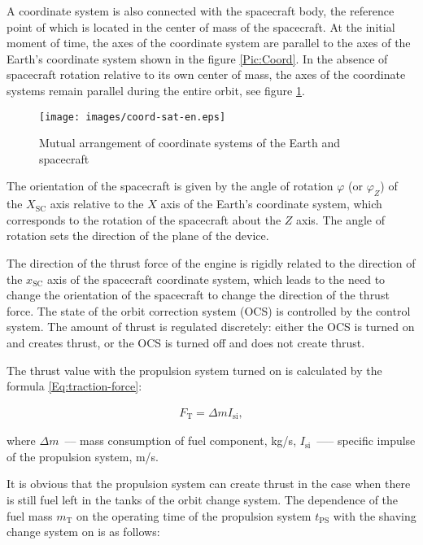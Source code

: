 \documentclass[12pt,a4paper]{article}
\begin{document}
A coordinate system is also connected with the spacecraft body, the reference point of which is located in the center of mass of the spacecraft. At the initial moment of time, the axes of the coordinate system are parallel to the axes of the Earth's coordinate system shown in the figure \ref{Pic:Coord}. In the absence of spacecraft rotation relative to its own center of mass, the axes of the coordinate systems remain parallel during the entire orbit, see figure \ref{Pic:Coord-Sat}.

\begin{figure}[tbh]
  \begin{center}
    \texttt{[image: images/coord-sat-en.eps]}
    \caption{Mutual arrangement of coordinate systems of the Earth and spacecraft}
    \label{Pic:Coord-Sat}
  \end{center}
\end{figure}

The orientation of the spacecraft is given by the angle of rotation $\varphi$ (or $\varphi_Z$) of the $X_{\text{SC}}$ axis relative to the $X$ axis of the Earth's coordinate system, which corresponds to the rotation of the spacecraft about the $Z$ axis. The angle of rotation sets the direction of the plane of the device.

The direction of the thrust force of the engine is rigidly related to the direction of the $x_{\text{SC}}$ axis of the spacecraft coordinate system, which leads to the need to change the orientation of the spacecraft to change the direction of the thrust force. The state of the orbit correction system (OCS) is controlled by the control system. The amount of thrust is regulated discretely: either the OCS is turned on and creates thrust, or the OCS is turned off and does not create thrust.

The thrust value with the propulsion system turned on is calculated by the formula
\ref{Eq:traction-force}:

\begin{eqnarray}
  F_{\text{T}} = \Delta m I_{\text{si}}, \label{Eq:traction-force}
\end{eqnarray}

where $\Delta m$~--– mass consumption of fuel component, kg/s, $I_{\text{si}}$~---– specific impulse of the propulsion system, m/s.

It is obvious that the propulsion system can create thrust in the case when there is still fuel left in the tanks of the orbit change system. The dependence of the fuel mass $m_{\text{T}}$ on the operating time of the propulsion system $t_{\text{PS}}$ with the shaving change system on is as follows:
\end{document}

